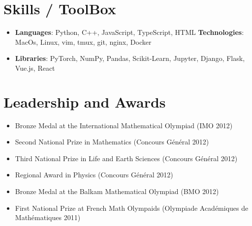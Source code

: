 \documentclass[letterpaper,10pt]{article}
\newcommand{\resumeSubHeadingListStart}{\begin{itemize}[leftmargin=*]}
\newcommand{\resumeSubHeadingListEnd}{\end{itemize}}
\newcommand{\shorterSection}[1]{\vspace{-10pt}\section{#1}}
\begin{document}
\shorterSection{Skills / ToolBox}
  \resumeSubHeadingListStart
  \small
    \item{
     \textbf{Languages}{: Python, C++, JavaScript, TypeScript, HTML}
     \hfill
     \textbf{Technologies}{: MacOs, Linux, vim, tmux, git, nginx, Docker}
    }
    \vspace{-5pt}
    \item{
     \textbf{Libraries}{: PyTorch, NumPy, Pandas, Scikit-Learn, Jupyter, Django, Flask, Vue.js, React}
    }
\resumeSubHeadingListEnd
\shorterSection{Leadership and Awards}
  \resumeSubHeadingListStart
\item\small {Bronze Medal at the International Mathematical Olympiad (IMO 2012)}
    \vspace{-5pt}
\item\small {Second National Prize in Mathematics (Concours Général 2012)}
    \vspace{-5pt}
\item\small {Third National Prize in Life and Earth Sciences (Concours Général 2012)}
    \vspace{-5pt}
\item\small {Regional Award in Physics (Concours Général 2012)}
    \vspace{-5pt}
\item\small {Bronze Medal at the Balkam Mathematical Olympiad (BMO 2012)}
    \vspace{-5pt}
\item\small {First National Prize at French Math Olympaids (Olympiade Académiques de Mathématiques 2011)}
  \resumeSubHeadingListEnd
\end{document}
